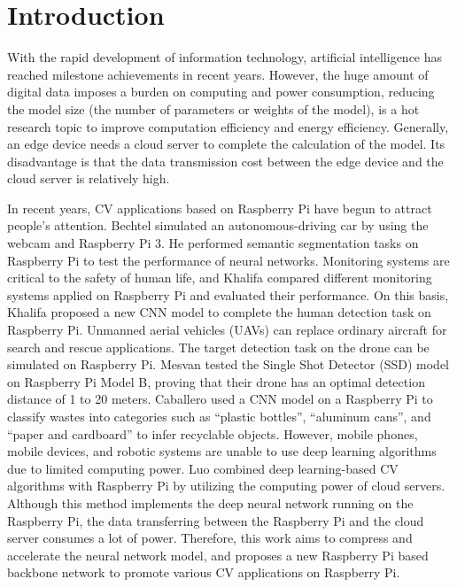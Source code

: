 \documentclass[default,iicol]{sn-jnl}
\theoremstyle{thmstyleone}\newtheorem{theorem}{Theorem}\newtheorem{proposition}[theorem]{Proposition}
\theoremstyle{thmstyletwo}\newtheorem{example}{Example}\newtheorem{remark}{Remark}
\theoremstyle{thmstylethree}\newtheorem{definition}{Definition}
\begin{document}





\maketitle

\section{Introduction}
With the rapid development of information technology, artificial intelligence has reached milestone achievements in recent years. However, the huge amount of digital data imposes a burden on computing and power consumption, reducing the model size (the number of parameters or weights of the model), is a hot research topic to improve computation efficiency and energy efficiency. Generally, an edge device needs a cloud server to complete the calculation of the model. Its disadvantage is that the data transmission cost between the edge device and the cloud server is relatively high.

In recent years, CV applications based on Raspberry Pi have begun to attract people’s attention. Bechtel \cite{bechtel2018deeppicar} simulated an autonomous-driving car by using the webcam and Raspberry Pi 3. He performed semantic segmentation tasks on Raspberry Pi to test the performance of neural networks. Monitoring systems are critical to the safety of human life, and Khalifa \cite{khalifa2019survey} compared different monitoring systems applied on Raspberry Pi and evaluated their performance. On this basis, Khalifa \cite{khalifa2021real} proposed a new CNN model to complete the human detection task on Raspberry Pi. Unmanned aerial vehicles (UAVs) can replace ordinary aircraft for search and rescue applications. The target detection task on the drone can be simulated on Raspberry Pi. Mesvan \cite{mesvan2021cnn} tested the Single Shot Detector (SSD) model on Raspberry Pi Model B, proving that their drone has an optimal detection distance of 1 to 20 meters. Caballero \cite{caballero2021inference} used a CNN model on a Raspberry Pi to classify wastes into categories such as ``plastic bottles'', ``aluminum cans'', and ``paper and cardboard'' to infer recyclable objects. However, mobile phones, mobile devices, and robotic systems are unable to use deep learning algorithms due to limited computing power. Luo \cite{luo2019cloud} combined deep learning-based CV algorithms with Raspberry Pi by utilizing the computing power of cloud servers. Although this method implements the deep neural network running on the Raspberry Pi, the data transferring between the Raspberry Pi and the cloud server consumes a lot of power. Therefore, this work aims to compress and accelerate the neural network model, and proposes a new Raspberry Pi based backbone network to promote various CV applications on Raspberry Pi.
\end{document}
